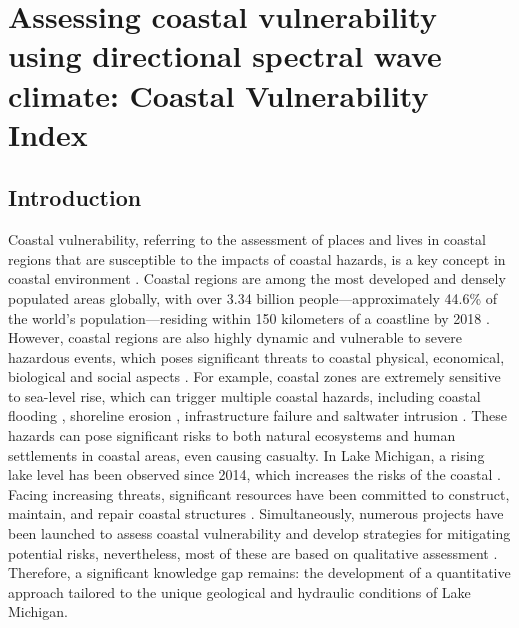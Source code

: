 \chapter{Assessing coastal vulnerability using directional spectral wave
climate: Coastal Vulnerability Index} 
\label{chapter5}


\section{Introduction}
\label{c5_Introduction}

Coastal vulnerability, referring to the assessment of places and lives in
coastal regions that are susceptible to the impacts of coastal hazards, is a key
concept in coastal environment \citep{bevacqua_coastal_2018}. Coastal regions
are among the most developed and densely populated areas globally, with over
3.34 billion people—approximately 44.6\% of the world's population—residing
within 150 kilometers of a coastline by 2018
\citep{cosby_accelerating_2024,martinez2007coasts}.  However, coastal regions
are also highly dynamic and vulnerable to severe hazardous events, which poses
significant threats to coastal physical, economical, biological and social
aspects \citep{bevacqua_coastal_2018,kantamaneni_assessing_2018}. For example,
coastal zones are extremely sensitive to sea-level rise, which can trigger
multiple coastal hazards, including coastal flooding
\citep{nicholls2010sea,kirezci2020projections,hinkel2014coastal}, shoreline
erosion \citep{vousdoukas2020sandy,mentaschi2018global,ranasinghe2016assessing},
infrastructure failure
\citep{hallegatte2013future,hinkel2014coastal,jongman2018effective} and
saltwater intrusion \citep{werner2009impact,ketabchi2016sea,habel2024hidden}.
These hazards can pose significant risks to both natural ecosystems and human
settlements in coastal areas, even causing casualty. In Lake Michigan, a rising
lake level has been observed since 2014, which increases the risks of the
coastal \citep{gronewold_hydrological_2016,zoet_analysis_2017,troy_rapid_2021}.
Facing increasing threats, significant resources have been committed to
construct, maintain, and repair coastal structures
\citep[\eg][]{krecicrehabilitation,angel_large-scale_1995}. Simultaneously,
numerous projects have been launched to assess coastal vulnerability and develop
strategies for mitigating potential risks, nevertheless, most of these are based
on qualitative assessment
\citep[\eg][]{salus_addressing_2024,pendleton2007coastal}. Therefore, a
significant knowledge gap remains: the development of a quantitative approach
tailored to the unique geological and hydraulic conditions of Lake Michigan.

